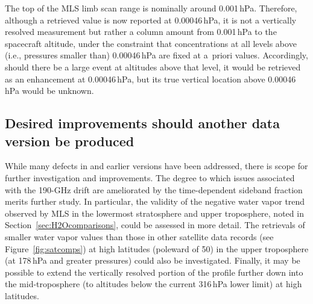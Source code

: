 The top of the MLS limb scan range is nominally around 0.001\,hPa. Therefore, although a retrieved value is now reported at 0.00046\,hPa, it is not a vertically resolved measurement but rather a column amount from 0.001\,hPa to the spacecraft altitude, under the constraint that concentrations at all levels above (i.e., pressures smaller than) 0.00046\,hPa are fixed at a~priori values. Accordingly, should there be a large  event at altitudes above that level, it would be retrieved as an enhancement at 0.00046\,hPa, but its true vertical location above 0.00046\,hPa would be unknown.

\subsection{Desired improvements should another data version be produced}

While many defects in \viv and earlier versions have been addressed, there is scope for further investigation and improvements. The degree to which issues associated with the \mbox{190-GHz} drift are ameliorated by the time-dependent sideband fraction merits further study.  In particular, the validity of the negative water vapor trend observed by MLS in the lowermost stratosphere and upper troposphere, noted in Section~\ref{sec:H2Ocomparisons}, could be assessed in more detail.  The retrievals of smaller water vapor values than those in other satellite data records (see Figure~\ref{fig:satcomps}) at high latitudes (poleward of 50\degsym) in the upper troposphere (at 178\,hPa and greater pressures) could also be investigated.  Finally, it may be possible to extend the vertically resolved portion of the  profile further down into the mid-troposphere (to altitudes below the current 316\,hPa lower limit) at high latitudes.  

